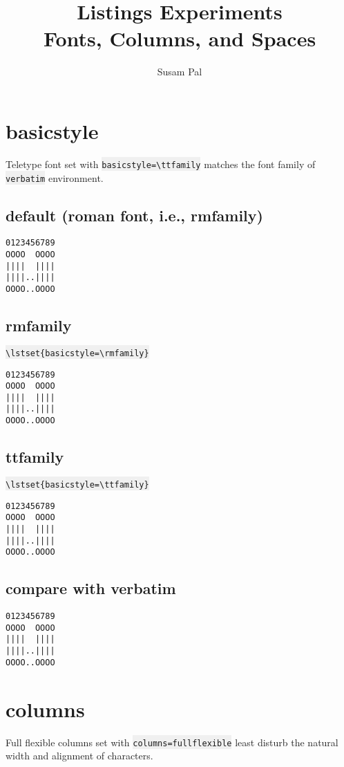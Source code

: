 \documentclass{article}
\title{Listings Experiments \\ Fonts, Columns, and Spaces}
\author{Susam Pal}
\newcommand{\bs}{\textbackslash}
\newcommand{\ttt}[1]{\colorbox[HTML]{f0f0f0}{\texttt{#1}}}
\begin{document}
\maketitle
\tableofcontents
\pagebreak

\section{basicstyle}
Teletype font set with \ttt{basicstyle=\bs{}ttfamily}
matches the font family of \ttt{verbatim} environment.

\subsection{default (roman font, i.e., rmfamily)}

{
\begin{lstlisting}
0123456789
OOOO  OOOO
||||  ||||
||||..||||
OOOO..OOOO
\end{lstlisting}
}

\subsection{rmfamily}
\ttt{\bs{}lstset\{basicstyle=\bs{}rmfamily\}}

{
\lstset{basicstyle=\rmfamily}
\begin{lstlisting}
0123456789
OOOO  OOOO
||||  ||||
||||..||||
OOOO..OOOO
\end{lstlisting}
}

\subsection{ttfamily}
\ttt{\bs{}lstset\{basicstyle=\bs{}ttfamily\}}

{
\lstset{basicstyle=\ttfamily}
\begin{lstlisting}
0123456789
OOOO  OOOO
||||  ||||
||||..||||
OOOO..OOOO
\end{lstlisting}
}

\subsection{compare with verbatim}
\begin{verbatim}
0123456789
OOOO  OOOO
||||  ||||
||||..||||
OOOO..OOOO
\end{verbatim}

\pagebreak


\section{columns}
Full flexible columns set with \ttt{columns=fullflexible} least disturb
the natural width and alignment of characters.
\end{document}

